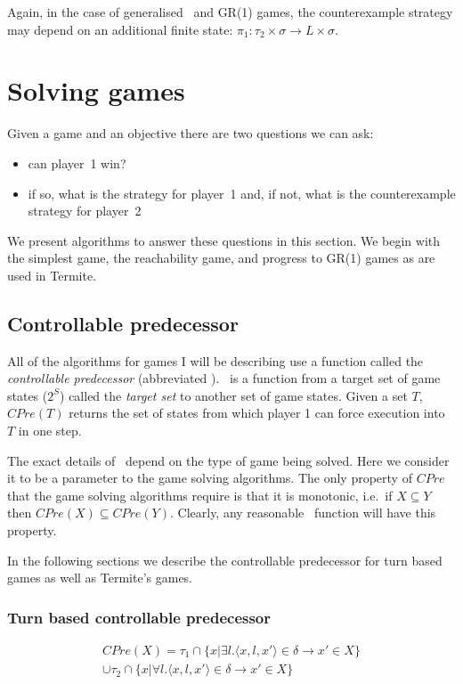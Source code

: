 Again, in the case of generalised \buchi\ and GR(1) games, the counterexample strategy may depend on an additional finite state: $\pi_1 : \tau_2 \times \sigma \rightarrow L \times \sigma$.

\section{Solving games}
\label{sec:intro_solving}

Given a game and an objective there are two questions we can ask:
\begin{itemize}
    \item can player~1 win?
    \item if so, what is the strategy for player~1 and, if not, what is the counterexample strategy for player~2
\end{itemize}

We present algorithms to answer these questions in this section. We begin with the simplest game, the reachability game, and progress to GR(1) games as are used in Termite.

\subsection{Controllable predecessor}

All of the algorithms for games I will be describing use a function called the \emph{controllable predecessor} (abbreviated \cpre). \cpre\ is a function from a target set of game states ($2^S$) called the \emph{target set} to another set of game states. Given a set $T$, $CPre(T)$ returns the set of states from which player 1 can force execution into $T$ in one step. 

The exact details of \cpre\ depend on the type of game being solved. Here we consider it to be a parameter to the game solving algorithms. The only property of $CPre$ that the game solving algorithms require is that it is monotonic, i.e.\ if $X \subseteq Y$ then $CPre(X) \subseteq CPre(Y)$. Clearly, any reasonable \cpre\ function will have this property.

In the following sections we describe the controllable predecessor for turn based games as well as Termite's games.

\subsubsection{Turn based controllable predecessor}

\begin{multline}
CPre(X) = \tau_1 \cap \{x | \exists l. \langle x, l, x' \rangle \in \delta \rightarrow x' \in X\} \\ \cup \tau_2 \cap \{x | \forall l. \langle x, l, x' \rangle \in \delta \rightarrow x' \in X \}
\label{eqn:turn_cpre}
\end{multline}

